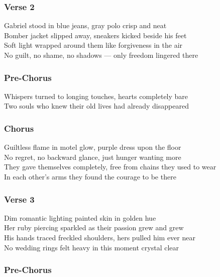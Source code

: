 \subsubsection{Verse 2}\label{verse-2-30}

Gabriel stood in blue jeans, gray polo crisp and neat\\
Bomber jacket slipped away, sneakers kicked beside his feet\\
Soft light wrapped around them like forgiveness in the air\\
No guilt, no shame, no shadows --- only freedom lingered there

\subsubsection{Pre-Chorus}\label{pre-chorus-55}

Whispers turned to longing touches, hearts completely bare\\
Two souls who knew their old lives had already disappeared

\subsubsection{Chorus}\label{chorus-77}

Guiltless flame in motel glow, purple dress upon the floor\\
No regret, no backward glance, just hunger wanting more\\
They gave themselves completely, free from chains they used to wear\\
In each other's arms they found the courage to be there

\subsubsection{Verse 3}\label{verse-3-16}

Dim romantic lighting painted skin in golden hue\\
Her ruby piercing sparkled as their passion grew and grew\\
His hands traced freckled shoulders, hers pulled him ever near\\
No wedding rings felt heavy in this moment crystal clear

\subsubsection{Pre-Chorus}\label{pre-chorus-56}

